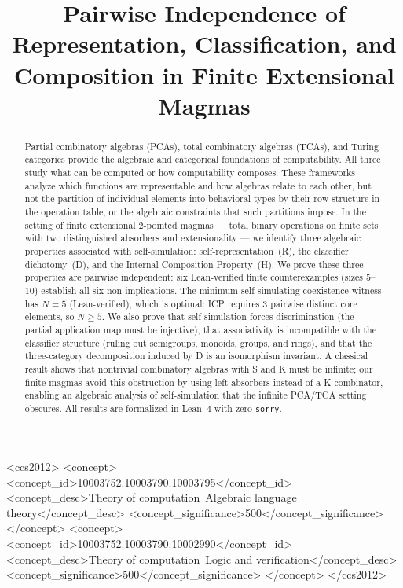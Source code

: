 \documentclass[sigconf,screen,review,anonymous]{acmart}
\theoremstyle{remark}
\begin{document}
\title{Pairwise Independence of Representation, Classification, and Composition in Finite Extensional Magmas}

\begin{CCSXML}
<ccs2012>
<concept>
<concept_id>10003752.10003790.10003795</concept_id>
<concept_desc>Theory of computation~Algebraic language theory</concept_desc>
<concept_significance>500</concept_significance>
</concept>
<concept>
<concept_id>10003752.10003790.10002990</concept_id>
<concept_desc>Theory of computation~Logic and verification</concept_desc>
<concept_significance>500</concept_significance>
</concept>
</ccs2012>
\end{CCSXML}



\begin{abstract}
Partial combinatory algebras (PCAs), total combinatory algebras (TCAs), and Turing categories provide the algebraic and categorical foundations of computability. All three study what can be computed or how computability composes. These frameworks analyze which functions are representable and how algebras relate to each other, but not the partition of individual elements into behavioral types by their row structure in the operation table, or the algebraic constraints that such partitions impose. In the setting of finite extensional 2-pointed magmas --- total binary operations on finite sets with two distinguished absorbers and extensionality --- we identify three algebraic properties associated with self-simulation: self-representation~(R), the classifier dichotomy~(D), and the Internal Composition Property~(H). We prove these three properties are pairwise independent: six Lean-verified finite counterexamples (sizes $5$--$10$) establish all six non-implications. The minimum self-simulating coexistence witness has $N\!=\!5$ (Lean-verified), which is optimal: ICP requires 3 pairwise distinct core elements, so $N \geq 5$. We also prove that self-simulation forces discrimination (the partial application map must be injective), that associativity is incompatible with the classifier structure (ruling out semigroups, monoids, groups, and rings), and that the three-category decomposition induced by D is an isomorphism invariant. A classical result shows that nontrivial combinatory algebras with S and K must be infinite; our finite magmas avoid this obstruction by using left-absorbers instead of a K combinator, enabling an algebraic analysis of self-simulation that the infinite PCA/TCA setting obscures. All results are formalized in Lean~4 with zero \texttt{sorry}.
\end{abstract}
\end{document}
